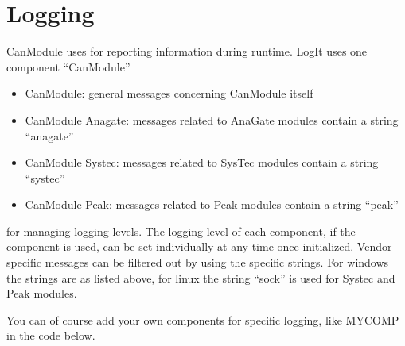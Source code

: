 \documentclass[letterpaper,10pt,english]{sphinxmanual}
\begin{document}
\chapter{Logging}
\label{\detokenize{logging:logging}}\label{\detokenize{logging::doc}}
CanModule uses  for reporting information during runtime. LogIt uses one component “CanModule”
\begin{itemize}
\item {} 
CanModule: general messages concerning CanModule itself

\item {} 
CanModule Anagate: messages related to AnaGate modules contain a string “anagate”

\item {} 
CanModule Systec: messages related to SysTec modules contain a string “systec”

\item {} 
CanModule Peak: messages related to Peak modules contain a string “peak”

\end{itemize}

for managing logging levels. The logging level of each component, if the component is used, can be set individually
at any time once initialized. Vendor specific messages can be filtered out by using the specific strings.
For windows the strings are as listed above, for linux the string “sock” is used for Systec and Peak modules.

You can of course add your own components for specific logging, like MYCOMP in the code below.

\end{document}
